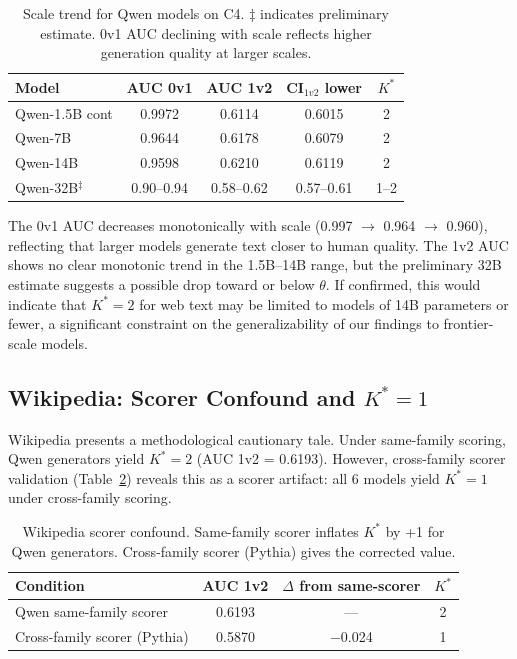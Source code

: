 \documentclass[11pt]{article}
\newcommand{\kstar}{K^*}
\newcommand{\thetaval}{\theta}
\begin{document}
\begin{table}[t]
\centering
\caption{Scale trend for Qwen models on C4. $\ddagger$ indicates preliminary estimate. 0v1 AUC declining with scale reflects higher generation quality at larger scales.}
\label{tab:scale}
\small
\begin{tabular}{lcccc}
\toprule
Model & AUC 0v1 & AUC 1v2 & CI$_{1v2}$ lower & $\kstar$ \\
\midrule
Qwen-1.5B cont & 0.9972 & 0.6114 & 0.6015 & 2 \\
Qwen-7B & 0.9644 & 0.6178 & 0.6079 & 2 \\
Qwen-14B & 0.9598 & 0.6210 & 0.6119 & 2 \\
Qwen-32B$^\ddagger$ & 0.90--0.94 & 0.58--0.62 & 0.57--0.61 & 1--2 \\
\bottomrule
\end{tabular}
\end{table}

The 0v1 AUC decreases monotonically with scale (0.997 $\to$ 0.964 $\to$ 0.960), reflecting that larger models generate text closer to human quality. The 1v2 AUC shows no clear monotonic trend in the 1.5B--14B range, but the preliminary 32B estimate suggests a possible drop toward or below $\thetaval$. If confirmed, this would indicate that $\kstar{=}2$ for web text may be limited to models of 14B parameters or fewer, a significant constraint on the generalizability of our findings to frontier-scale models.


\subsection{Wikipedia: Scorer Confound and $\kstar{=}1$}
\label{sec:wiki}

Wikipedia presents a methodological cautionary tale. Under same-family scoring, Qwen generators yield $\kstar{=}2$ (AUC 1v2 = 0.6193). However, cross-family scorer validation (Table~\ref{tab:wiki_confound}) reveals this as a scorer artifact: all 6 models yield $\kstar{=}1$ under cross-family scoring.

\begin{table}[t]
\centering
\caption{Wikipedia scorer confound. Same-family scorer inflates $\kstar$ by +1 for Qwen generators. Cross-family scorer (Pythia) gives the corrected value.}
\label{tab:wiki_confound}
\small
\begin{tabular}{lccc}
\toprule
Condition & AUC 1v2 & $\Delta$ from same-scorer & $\kstar$ \\
\midrule
Qwen same-family scorer & 0.6193 & --- & 2 \\
Cross-family scorer (Pythia) & 0.5870 & $-$0.024 & 1 \\
\bottomrule
\end{tabular}
\end{table}
\end{document}

